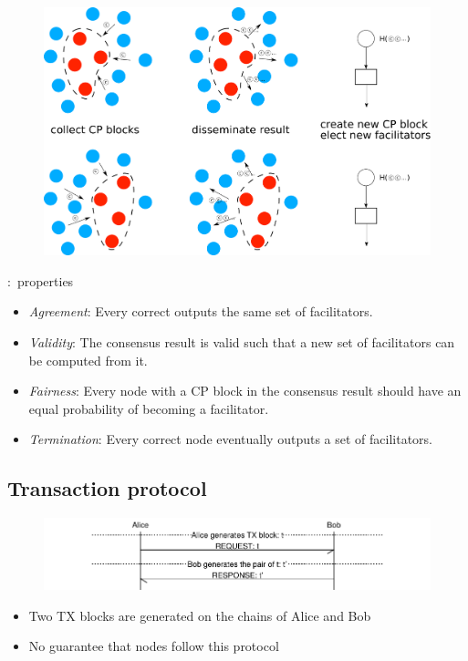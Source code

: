\documentclass{beamer}
\begin{document}
\begin{frame}{\subsecname}
  \begin{figure}
    \includegraphics[width=1.0\textwidth]{consensus-overview}
    \centering
  \end{figure}
\end{frame}

\begin{frame}{\subsecname:~properties}
\label{def:consensus}
\begin{itemize}
    \item \emph{Agreement}:
        Every correct outputs the same set of facilitators.
    \item \emph{Validity}:
      The consensus result is valid such that a new set of facilitators can be computed from it.
    \item \emph{Fairness}:
        Every node with a CP block in the consensus result should have an equal probability of becoming a facilitator.
    \item \emph{Termination}:
        Every correct node eventually outputs a set of facilitators.
\end{itemize}
\end{frame}

\subsection{Transaction protocol}
\begin{frame}{\subsecname}
  \begin{figure}[h]
  \includegraphics[width=1.0\textwidth]{tx-proto}
  \centering
  \end{figure}
\begin{itemize}
\item Two TX blocks are generated on the chains of Alice and Bob
\item No guarantee that nodes follow this protocol
\end{itemize}
\end{frame}
\end{document}
